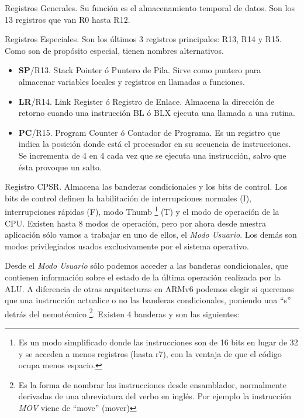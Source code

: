 \begin{descript}
  \item[Registros Generales.]
    Su función es el almacenamiento temporal de datos. Son los 13 registros
    que van R0 hasta R12.
  \item[Registros Especiales.]
    Son los últimos 3 registros principales: R13, R14 y R15. Como son de
    propósito especial, tienen nombres alternativos.

    \begin{itemize}
      \item{\textbf{SP}/R13. Stack Pointer ó Puntero de Pila. Sirve como puntero para almacenar
        variables locales y registros en llamadas a funciones.}
      \item{\textbf{LR}/R14. Link Register ó Registro de Enlace. Almacena la dirección de retorno
        cuando una instrucción BL ó BLX ejecuta una llamada a una rutina.}
      \item{\textbf{PC}/R15. Program Counter ó Contador de Programa. Es un registro que indica
        la posición donde está el procesador en su secuencia de instrucciones. Se
        incrementa de 4 en 4 cada vez que se ejecuta una instrucción, salvo que ésta
        provoque un salto.}
    \end{itemize}

  \item[Registro CPSR.]
        Almacena las banderas condicionales y los bits de control. Los bits de control
        definen la habilitación de interrupciones normales (I),
        interrupciones rápidas (F), modo Thumb \footnote{Es un modo simplificado donde las
        instrucciones son de 16 bits en lugar de 32 y se acceden a menos registros (hasta r7),
        con la ventaja de que el código ocupa menos espacio.} (T) y el modo de operación
        de la CPU. Existen hasta 8 modos de operación, pero por ahora desde nuestra aplicación
        sólo vamos a trabajar en uno de ellos, el {\it Modo Usuario}. Los demás son modos
        privilegiados usados exclusivamente por el sistema operativo.

        Desde el {\it Modo Usuario} sólo podemos acceder a las banderas condicionales, que
        contienen información sobre el estado de la última operación realizada por la ALU.
        A diferencia de otras arquitecturas en ARMv6 podemos elegir si queremos que una
        instrucción actualice o no las banderas condicionales, poniendo una ``s'' detrás
        del nemotécnico \footnote{Es la forma de nombrar las instrucciones desde
        ensamblador, normalmente derivadas de una abreviatura del verbo en inglés. Por
        ejemplo la instrucción {\it MOV} viene de ``move'' (mover) }. Existen 4 banderas
        y son las siguientes:


\end{descript}
